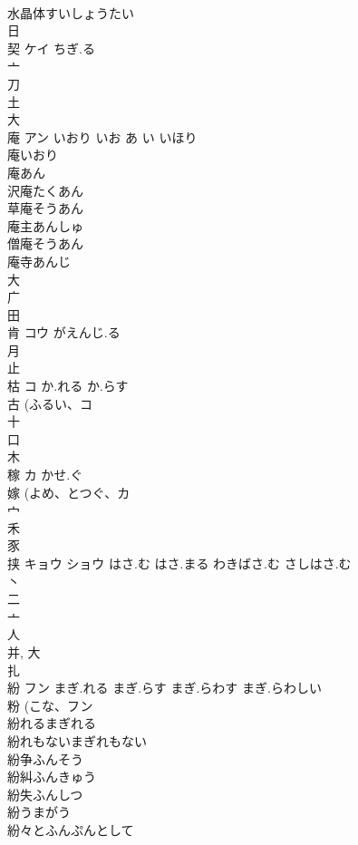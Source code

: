 \documentclass[8pt]{extreport}
\begin{document}
\begin{CJK}{UTF8}{min}
\\	水晶体すいしょうたい 
\\	日 
\\	契	ケイ	ちぎ.る	
\\	亠 
\\	刀 
\\	土 
\\	大 
\\	庵	アン	いおり いお あ い いほり	
\\	庵いおり 
\\	庵あん 
\\	沢庵たくあん 
\\	草庵そうあん 
\\	庵主あんしゅ 
\\	僧庵そうあん 
\\	庵寺あんじ 
\\	大 
\\	广 
\\	田 
\\	肯	コウ	がえんじ.る	
\\	月 
\\	止 
\\	枯	コ	か.れる か.らす	
\\	古 (ふるい、コ 
\\	十 
\\	口 
\\	木 
\\	稼	カ	かせ.ぐ	
\\	嫁 (よめ、とつぐ、カ 
\\	宀 
\\	禾 
\\	豕 
\\	挟	キョウ ショウ	はさ.む はさ.まる わきばさ.む さしはさ.む	
\\	丶 
\\	二 
\\	亠 
\\	人 
\\	并, 大 
\\	扎	
\\	紛	フン	まぎ.れる まぎ.らす まぎ.らわす まぎ.らわしい	
\\	粉 (こな、フン 
\\	紛れるまぎれる
\\	紛れもないまぎれもない
\\	紛争ふんそう
\\	紛糾ふんきゅう
\\	紛失ふんしつ
\\	紛うまがう
\\	紛々とふんぷんとして

\end{CJK}
\end{document}
